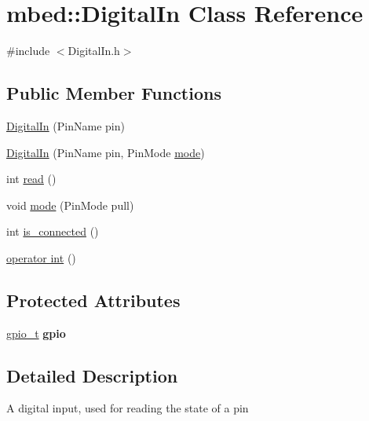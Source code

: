 \hypertarget{classmbed_1_1_digital_in}{}\section{mbed\+:\+:Digital\+In Class Reference}
\label{classmbed_1_1_digital_in}


{\ttfamily \#include $<$Digital\+In.\+h$>$}

\subsection*{Public Member Functions}
\begin{DoxyCompactItemize}
\item 
\hyperlink{classmbed_1_1_digital_in_a6593a15bcecfd3666c49bba83c81ee9b}{Digital\+In} (Pin\+Name pin)
\item 
\hyperlink{classmbed_1_1_digital_in_a4f07c90ffec20a9724ef42a61f7d21eb}{Digital\+In} (Pin\+Name pin, Pin\+Mode \hyperlink{classmbed_1_1_digital_in_a9f3e23f670999a3f0ecb5ad959d1667a}{mode})
\item 
int \hyperlink{classmbed_1_1_digital_in_aa19e2bc687842e7a1414ec5599f4f0e9}{read} ()
\item 
void \hyperlink{classmbed_1_1_digital_in_a9f3e23f670999a3f0ecb5ad959d1667a}{mode} (Pin\+Mode pull)
\item 
int \hyperlink{classmbed_1_1_digital_in_a0d765cc5944adfd9544cfb881d3d25e2}{is\+\_\+connected} ()
\item 
\hyperlink{classmbed_1_1_digital_in_add1742ff230f5a6ba35f26056d11b4f6}{operator int} ()
\end{DoxyCompactItemize}
\subsection*{Protected Attributes}
\begin{DoxyCompactItemize}
\item 
\hyperlink{structgpio__t}{gpio\+\_\+t} {\bfseries gpio}\hypertarget{classmbed_1_1_digital_in_a6cbb51f8b90fc874a7f720f8e5c70e9e}{}\label{classmbed_1_1_digital_in_a6cbb51f8b90fc874a7f720f8e5c70e9e}

\end{DoxyCompactItemize}


\subsection{Detailed Description}
A digital input, used for reading the state of a pin

